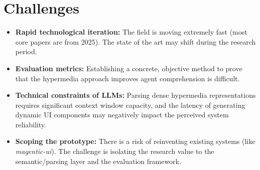\documentclass[12pt,a4paper,english,oneside]{article}
\begin{document}




\section{Challenges}


\begin{itemize}
    \item \textbf{Rapid technological iteration:} The field is moving extremely fast (most core papers are from 2025). The state of the art may shift during the research period.
    \item \textbf{Evaluation metrics:} Establishing a concrete, objective method to prove that the hypermedia approach improves agent comprehension is difficult.
    \item \textbf{Technical constraints of LLMs:} Parsing dense hypermedia representations requires significant context window capacity, and the latency of generating dynamic UI components may negatively impact the perceived system reliability. 
    \item \textbf{Scoping the prototype:} There is a risk of reinventing existing systems (like \emph{magentic-ui}). The challenge is isolating the research value to the semantic/parsing layer and the evaluation framework.
\end{itemize}
\end{document}
